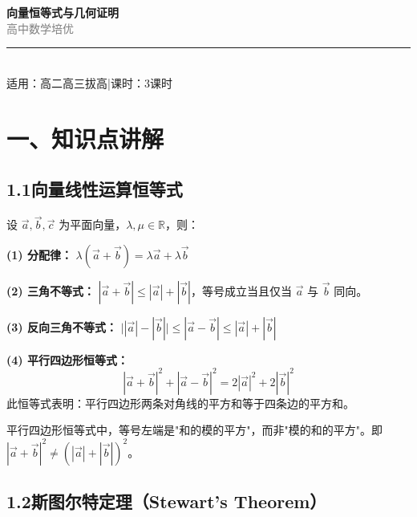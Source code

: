 \documentclass[12pt, a4paper]{ctexart}
\begin{document}
\begin{center}
{\Huge\bfseries\textcolor{mainblue}{向量恒等式与几何证明}}\\[12pt]
{\Large\textcolor{gray}{高\quad 中\quad 数\quad 学\quad 培\quad 优}}\\[8pt]
\rule{0.6\textwidth}{1pt}\\[8pt]
{\normalsize 适用：高二高三拔高\quad |\quad 课时：3课时}
\end{center}
\vspace{10pt}

\section*{\textcolor{mainblue}{一、知识点讲解}}

\subsection*{1.1\quad 向量线性运算恒等式}

\begin{knowledgebox}[向量线性运算基本恒等式]
设 $\vec{a}, \vec{b}, \vec{c}$ 为平面向量，$\lambda, \mu \in \mathbb{R}$，则：

\textbf{(1) 分配律：} $\lambda(\vec{a} + \vec{b}) = \lambda\vec{a} + \lambda\vec{b}$

\textbf{(2) 三角不等式：} $|\vec{a} + \vec{b}| \leq |\vec{a}| + |\vec{b}|$，等号成立当且仅当 $\vec{a}$ 与 $\vec{b}$ 同向。

\textbf{(3) 反向三角不等式：} $\bigl||\vec{a}| - |\vec{b}|\bigr| \leq |\vec{a} - \vec{b}| \leq |\vec{a}| + |\vec{b}|$

\textbf{(4) 平行四边形恒等式：}
\[
|\vec{a} + \vec{b}|^2 + |\vec{a} - \vec{b}|^2 = 2|\vec{a}|^2 + 2|\vec{b}|^2
\]
此恒等式表明：平行四边形两条对角线的平方和等于四条边的平方和。
\end{knowledgebox}

\begin{warnbox}[易错提醒]
平行四边形恒等式中，等号左端是"和的模的平方"，而非"模的和的平方"。即 $|\vec{a}+\vec{b}|^2 \neq (|\vec{a}|+|\vec{b}|)^2$。
\end{warnbox}

\subsection*{1.2\quad 斯图尔特定理（Stewart's Theorem）}
\end{document}

